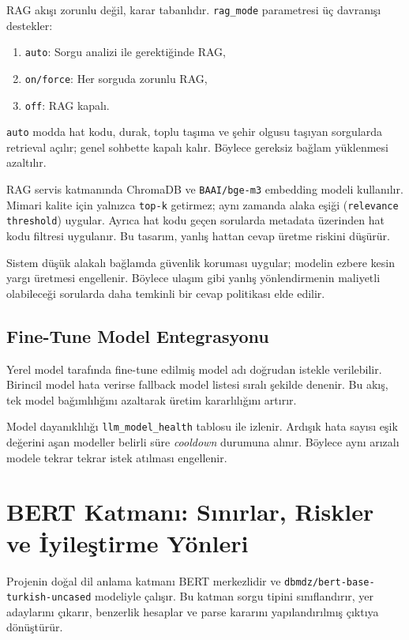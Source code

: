RAG akışı zorunlu değil, karar tabanlıdır. \texttt{rag\_mode} parametresi üç davranışı destekler:
\begin{enumerate}
    \item \texttt{auto}: Sorgu analizi ile gerektiğinde RAG,
    \item \texttt{on/force}: Her sorguda zorunlu RAG,
    \item \texttt{off}: RAG kapalı.
\end{enumerate}

\texttt{auto} modda hat kodu, durak, toplu taşıma ve şehir olgusu taşıyan sorgularda retrieval açılır; genel sohbette kapalı kalır. Böylece gereksiz bağlam yüklenmesi azaltılır.

RAG servis katmanında ChromaDB ve \texttt{BAAI/bge-m3} embedding modeli kullanılır. Mimari kalite için yalnızca \texttt{top-k} getirmez; aynı zamanda alaka eşiği (\texttt{relevance threshold}) uygular. Ayrıca hat kodu geçen sorularda metadata üzerinden hat kodu filtresi uygulanır. Bu tasarım, yanlış hattan cevap üretme riskini düşürür.

Sistem düşük alakalı bağlamda güvenlik koruması uygular; modelin ezbere kesin yargı üretmesi engellenir. Böylece ulaşım gibi yanlış yönlendirmenin maliyetli olabileceği sorularda daha temkinli bir cevap politikası elde edilir.

\subsection{Fine-Tune Model Entegrasyonu}

Yerel model tarafında fine-tune edilmiş model adı doğrudan istekle verilebilir. Birincil model hata verirse fallback model listesi sıralı şekilde denenir. Bu akış, tek model bağımlılığını azaltarak üretim kararlılığını artırır.

Model dayanıklılığı \texttt{llm\_model\_health} tablosu ile izlenir. Ardışık hata sayısı eşik değerini aşan modeller belirli süre \textit{cooldown} durumuna alınır. Böylece aynı arızalı modele tekrar tekrar istek atılması engellenir.

\section{BERT Katmanı: Sınırlar, Riskler ve İyileştirme Yönleri}

Projenin doğal dil anlama katmanı BERT merkezlidir ve \texttt{dbmdz/bert-base-turkish-uncased} modeliyle çalışır. Bu katman sorgu tipini sınıflandırır, yer adaylarını çıkarır, benzerlik hesaplar ve parse kararını yapılandırılmış çıktıya dönüştürür.

